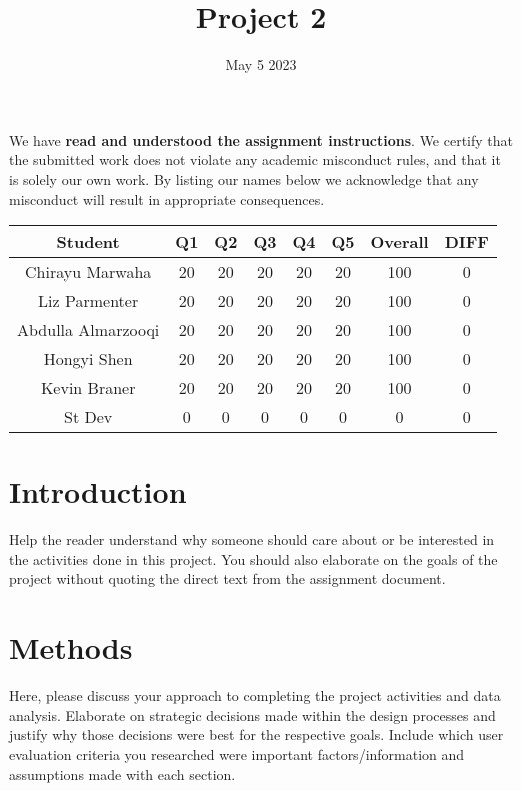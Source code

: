 \documentclass{article}
\title{Project 2}
\date{May 5 2023}
\begin{document}
\maketitle
\noindent We have {\bf read and understood the assignment instructions}. We certify that the submitted work does not violate any academic misconduct rules, and that it is solely our own work. By listing our names below we acknowledge that any misconduct will result in appropriate consequences. 

\vspace{0.2in}


\vspace{0.3in}

\begin{table}[h!]
  \begin{center}
    \label{tab:table1}
    \begin{tabular}{c|ccccc|c|c}
      Student & Q1 & Q2 & Q3 & Q4 & Q5 & Overall & DIFF\\
      \hline
      Chirayu Marwaha & 20 & 20 & 20 & 20 & 20 & 100 & 0\\
      Liz Parmenter & 20 & 20 & 20 & 20 & 20 & 100 & 0\\
      Abdulla Almarzooqi & 20 & 20 & 20 & 20 & 20 & 100 & 0\\
      Hongyi Shen & 20 & 20 & 20 & 20 & 20 & 100 & 0\\
      Kevin Braner & 20 & 20 & 20 & 20 & 20 & 100 & 0\\
      \hline
      St Dev & 0 & 0 & 0 & 0 & 0 & 0 & 0
    \end{tabular}
  \end{center}
\end{table}

\section{Introduction}
Help the reader understand why someone should care about or be interested in the activities done in this project. You should also elaborate on the goals of the project without quoting the direct text from the assignment document.

\section{Methods}
Here, please discuss your approach to completing the project activities and data analysis. Elaborate on strategic decisions made within the design processes and justify why those decisions were best for the respective goals. Include which user evaluation criteria you researched were important factors/information and assumptions made with each section.
\end{document}
